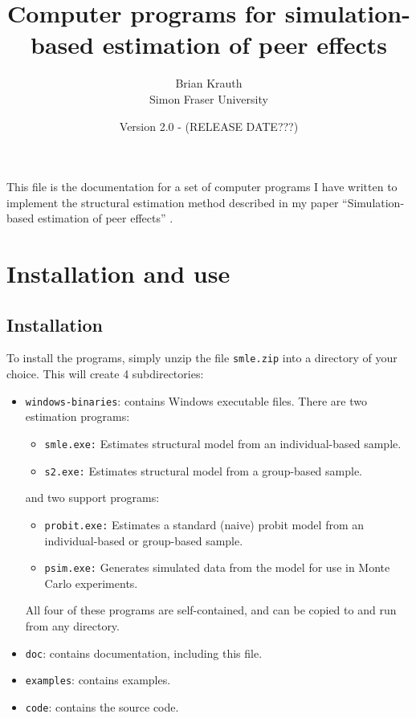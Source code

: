 \documentclass{article}
\begin{document}
\title{Computer programs for simulation-based estimation of peer effects}
\author{Brian Krauth \\
	Simon Fraser University}
\date{Version 2.0 - (RELEASE DATE???)}
	
\maketitle

This file is the documentation for a set of computer programs
I have written to implement the structural estimation method
described in my paper ``Simulation-based estimation of peer effects'' \cite{smle}.

\section{Installation and use}

\subsection{Installation}

To install the programs, simply unzip the file {\tt smle.zip} into a directory of your choice.  
This will create 4 subdirectories:
\begin{itemize}
	\item {\tt windows-binaries}: contains Windows executable files.  
		There are two estimation programs:
		\begin{itemize}
			\item {\tt smle.exe:} Estimates structural model from an individual-based sample.
			\item {\tt s2.exe:} Estimates structural model from a group-based sample.
		\end{itemize}
		and two support programs:
		\begin{itemize}
			\item {\tt probit.exe:} Estimates a standard (naive) probit model from an individual-based or group-based
			sample.
			\item {\tt psim.exe:} Generates simulated data from the model for use in Monte Carlo experiments.
		\end{itemize}
		All four of these programs are self-contained, and can be copied to and run
		from any directory.
	\item {\tt doc}: contains documentation, including this file.
	\item {\tt examples}: contains examples.
	\item {\tt code}: contains the source code.
\end{itemize}
\end{document}
